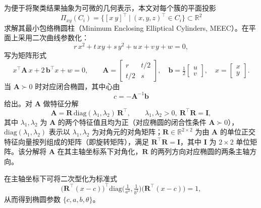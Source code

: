 为便于将聚类结果抽象为可微的几何表示，本文对每个簇的平面投影
\begin{equation}
\Pi_{xy}(C_i)=\big\{[x\ y]^\top\ \big|\ (x,y,z)^\top\in C_i\big\}\subset\mathbb{R}^2
\label{eq:cluster_proj}
\end{equation}
求解其最小包络椭圆柱（Minimum Enclosing Elliptical Cylinders, MEEC）。在平面上采用二次曲线参数化：
\begin{equation}
r\,x^2 + t\,xy + s\,y^2 + u\,x + v\,y + w = 0,
\label{eq:ellipse_quad}
\end{equation}
写为矩阵形式
\begin{equation}
x^\top \mathbf{A}\,x + 2\,\mathbf{b}^\top x + w = 0,\qquad 
\mathbf{A}=
\begin{bmatrix}
r & t/2\\[2pt]
t/2 & s
\end{bmatrix},\quad 
\mathbf{b}=\tfrac{1}{2}
\begin{bmatrix}
u\\[2pt]
v
\end{bmatrix},\quad 
x=
\begin{bmatrix}
x\\[2pt]
y
\end{bmatrix}.
\label{eq:ellipse_matrix}
\end{equation}
当 \(\mathbf{A}\succ 0\) 时对应闭合椭圆，其中心由
\begin{equation}
c=-\mathbf{A}^{-1}\mathbf{b}
\label{eq:ellipse_center}
\end{equation}
给出。对 \(\mathbf{A}\) 做特征分解
\begin{equation}
\mathbf{A}=\mathbf{R}\,\mathrm{diag}(\lambda_1,\lambda_2)\,\mathbf{R}^\top,\qquad 
\lambda_1,\lambda_2>0,\ \mathbf{R}^\top\mathbf{R}=\mathbf{I},
\label{eq:ellipse_eig}
\end{equation}
其中 $\lambda_1,\lambda_2$ 为 $\mathbf{A}$ 的两个特征值且均为正（对应椭圆的闭合性条件 $\mathbf{A}\succ 0$），$\mathrm{diag}(\lambda_1,\lambda_2)$ 表示以 $\lambda_1,\lambda_2$ 为对角元的对角矩阵；$\mathbf{R}\in\mathbb{R}^{2\times 2}$ 为由 $\mathbf{A}$ 的单位正交特征向量按列组成的矩阵（即旋转矩阵），满足 $\mathbf{R}^\top\mathbf{R}=\mathbf{I}$，其中 $\mathbf{I}$ 为 $2\times 2$ 单位矩阵。该分解将 $\mathbf{A}$ 在其主轴坐标系下对角化，$\mathbf{R}$ 的两列方向对应椭圆的两条主轴方向。

在主轴坐标下可将二次型化为标准式
\begin{equation}
\big(\mathbf{R}^\top(x-c)\big)^\top 
\mathrm{diag}\!\Big(\tfrac{1}{a^2},\tfrac{1}{b^2}\Big)
\big(\mathbf{R}^\top(x-c)\big)=1,
\label{eq:ellipse_standard}
\end{equation}
从而得到椭圆参数 \(\{c,a,b,\theta\}\)。

